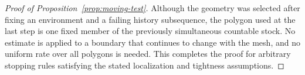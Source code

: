 \begin{proof}[Proof of Proposition~\ref{prop:moving-test}]
Although the geometry was selected after fixing an environment and
a failing history subsequence, the polygon used at the last step
is one fixed member of the previously simultaneous countable stock.
No estimate is applied to a boundary that continues to change with
the mesh, and no uniform rate over all polygons is needed.  This
completes the proof for arbitrary stopping rules satisfying the
stated localization and tightness assumptions.
\end{proof}
